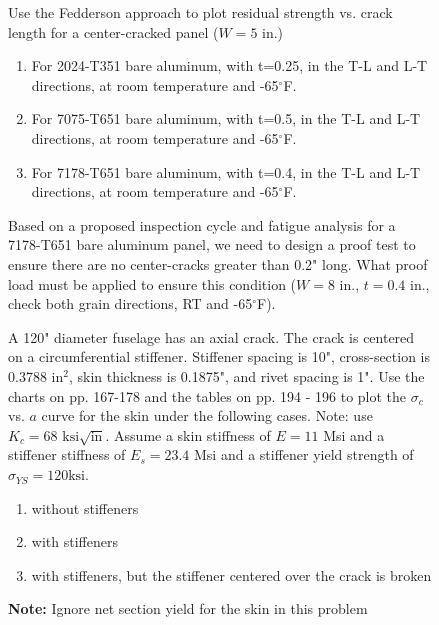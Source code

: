 \documentclass[12pt, oneside]{article}
\begin{document}
\begin{enumerate}
\begin{figure}[H]
	\item Use the Fedderson approach to plot residual strength vs. crack length for a center-cracked panel ($W=5$ in.) 
	\begin{enumerate}
		\item For 2024-T351 bare aluminum, with t=0.25, in the T-L and L-T directions, at room temperature and -65$^\circ$F.
		\item For 7075-T651 bare aluminum, with t=0.5, in the T-L and L-T directions, at room temperature and -65$^\circ$F.
		\item For 7178-T651 bare aluminum, with t=0.4, in the T-L and L-T directions, at room temperature and -65$^\circ$F.
	\end{enumerate}
\end{figure}

\begin{figure}[H]
	\item Based on a proposed inspection cycle and fatigue analysis for a 7178-T651 bare aluminum panel, we need to design a proof test to ensure there are no center-cracks greater than 0.2" long. What proof load must be applied to ensure this condition ($W=8$ in., $t=0.4$ in., check both grain directions, RT and -65$^\circ$F).
\end{figure}

\begin{figure}[H]
	\item A 120" diameter fuselage has an axial crack. The crack is centered on a circumferential stiffener. Stiffener spacing is 10", cross-section is 0.3788 in$^2$, skin thickness is 0.1875", and rivet spacing is 1". Use the charts on pp. 167-178  and the tables on pp. 194 - 196 to plot the $\sigma_c$ vs. $a$ curve for the skin under the following cases. Note: use $K_c = 68\text{ ksi} \sqrt{\text{in}}$. Assume a skin stiffness of $E = 11$ Msi and a stiffener stiffness of $E_s = 23.4$ Msi and a stiffener yield strength of $\sigma_{YS} = 120 \text{ksi}$.
	\begin{enumerate}
		\item without stiffeners
		\item with stiffeners
		\item with stiffeners, but the stiffener centered over the crack is broken
	\end{enumerate}
	\textbf{Note:} Ignore net section yield for the skin in this problem
\end{figure}

\end{enumerate}
\end{document}
